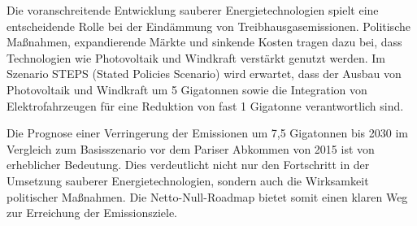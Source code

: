 \documentclass{article}
\begin{document}
Die voranschreitende Entwicklung sauberer Energietechnologien spielt eine entscheidende Rolle bei der Eindämmung von Treibhausgasemissionen. Politische Maßnahmen, expandierende Märkte und sinkende Kosten tragen dazu bei, dass Technologien wie Photovoltaik und Windkraft verstärkt genutzt werden. Im Szenario STEPS (Stated Policies Scenario) wird erwartet, dass der Ausbau von Photovoltaik und Windkraft um 5 Gigatonnen sowie die Integration von Elektrofahrzeugen für eine Reduktion von fast 1 Gigatonne verantwortlich sind.

Die Prognose einer Verringerung der Emissionen um 7,5 Gigatonnen bis 2030 im Vergleich zum Basisszenario vor dem Pariser Abkommen von 2015 ist von erheblicher Bedeutung. Dies verdeutlicht nicht nur den Fortschritt in der Umsetzung sauberer Energietechnologien, sondern auch die Wirksamkeit politischer Maßnahmen. Die Netto-Null-Roadmap bietet somit einen klaren Weg zur Erreichung der Emissionsziele.
\end{document}
